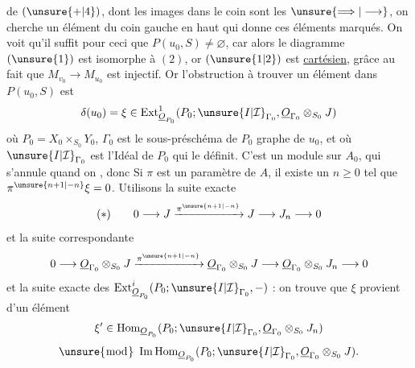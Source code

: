  de $(\unsure{+|4})$, dont les images dans le coin
 sont les $\unsure{\Longrightarrow|\longrightarrow}$, on cherche un élément
du coin gauche en haut qui donne ces
éléments marqués. On voit qu'il suffit pour
ceci que $P(u_0,S)\ne\varnothing$, car alors le diagramme
$(\unsure{1})$ est isomorphe à $(2)$, or $(\unsure{1|2})$ est
\uline{cartésien}, grâce au fait que $M_{v_0}\longrightarrow M_{u_0}$ est
injectif. Or l'obstruction à trouver un
élément dans $P(u_0,S)$ est 
\[
\delta(u_0)=\xi\in\operatorname{Ext}^{1}_{\underline{O}_{P_0}}
(P_0;\unsure{I|\mathcal{I}}_{\Gamma_0},\underline{O}_{\Gamma_0}\otimes_{S_0}J)
\]
où $P_0=X_0\times_{S_0}Y_0$,  $\Gamma_0$ est le sous-préschéma
de $P_0$ graphe de $u_0$, et où $\unsure{I|\mathcal{I}}_{\Gamma_0}$ est l'Idéal de $P_0$
qui le définit. C'est un module sur $A_0$,
qui s'annule quand on 
, donc
Si $\pi$ est un paramètre de $A$, il existe un
$n\geq0$ tel que $\pi^{\unsure{n+1|-n}}\xi=0$. Utilisons la suite exacte
\[
(*)\qquad 0\longrightarrow J\xrightarrow{\pi^{\unsure{n+1|-n}}}J\longrightarrow J_n\longrightarrow0
\]
et la suite correspondante
\[
0\longrightarrow\underline{O}_{\Gamma_0}\otimes_{S_0}J
\xrightarrow{\pi^{\unsure{n+1|-n}}}\underline{O}_{\Gamma_0}\otimes_{S_0}J
\longrightarrow\underline{O}_{\Gamma_0}\otimes_{S_0}J_n\longrightarrow0
\]
et la suite exacte des $\operatorname{Ext}^{i}_{\underline{O}_{P_0}}(P_0;\unsure{I|\mathcal{I}}_{\Gamma_0},-)$ : on
trouve que $\xi$ provient d'un élément
\[
\xi'\in\operatorname{Hom}_{\underline{O}_{P_0}}(P_0;\unsure{I|\mathcal{I}}_{\Gamma_0},\underline{O}_{\Gamma_0}\otimes_{S_0}J_n)
\]
\[
\unsure{\bmod}\ \operatorname{Im}\operatorname{Hom}_{\underline{O}_{P_0}}
(P_0;\unsure{I|\mathcal{I}}_{\Gamma_0},\underline{O}_{\Gamma_0}\otimes_{S_0}J).
\]
